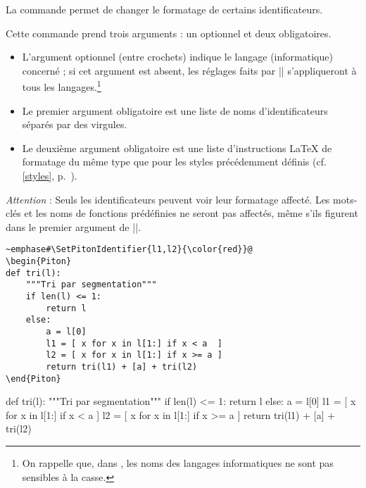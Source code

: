 \documentclass[dvipsnames,svgnames]{article}
\begin{document}
\label{SetPitonIdentifier}

La commande  permet de changer le formatage de
certains identificateurs.

\smallskip
Cette commande prend trois arguments : un optionnel et deux obligatoires.

\begin{itemize}
\item L'argument optionnel (entre crochets) indique le langage (informatique) concerné ;
si cet argument est absent, les réglages faits par |\SetPitonIdentifier| s'appliqueront à
tous les langages.\footnote{On rappelle que, dans , les noms des langages
  informatiques ne sont pas sensibles à la casse.}

\item Le premier argument obligatoire est une liste de noms d'identificateurs séparés par
des virgules.

\item Le deuxième argument obligatoire est une liste d'instructions LaTeX de formatage du
même type que pour les styles précédemment définis (cf. \ref{styles},
p.~\pageref{styles}).


\end{itemize}

\emph{Attention} : Seuls les identificateurs peuvent voir leur formatage affecté. Les
mots-clés et les noms de fonctions prédéfinies ne seront pas affectés, même s'ils figurent
dans le premier argument de |\SetPitonIdentifier|.

\begin{Verbatim}
~emphase#\SetPitonIdentifier{l1,l2}{\color{red}}@
\begin{Piton}
def tri(l):
    """Tri par segmentation"""
    if len(l) <= 1:
        return l
    else:
        a = l[0]
        l1 = [ x for x in l[1:] if x < a  ]
        l2 = [ x for x in l[1:] if x >= a ]
        return tri(l1) + [a] + tri(l2)
\end{Piton}
\end{Verbatim}


\bigskip

\begingroup


\begin{Piton}
def tri(l):
    """Tri par segmentation"""
    if len(l) <= 1:
        return l
    else:
        a = l[0]
        l1 = [ x for x in l[1:] if x < a  ]
        l2 = [ x for x in l[1:] if x >= a ]
        return tri(l1) + [a] + tri(l2)
\end{Piton}
\end{document}
